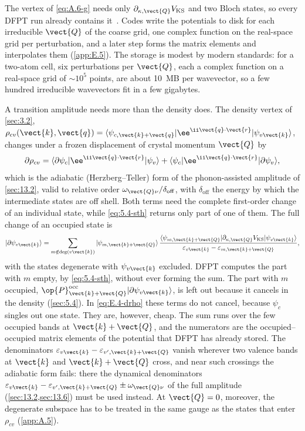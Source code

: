 The vertex of \cref{eq:A.6-g} needs only $\partial_{\kappa,\vect{Q}}V_{\mathrm{KS}}$ and two Bloch states, so every DFPT run already contains it~\cite[Sect.~III.B.3]{giustino2017electron}. Codes write the potentials to disk for each irreducible $\vect{Q}$ of the coarse grid, one complex function on the real-space grid per perturbation, and a later step forms the matrix elements and interpolates them (\cref{app:E.5}). The storage is modest by modern standards: for a two-atom cell, six perturbations per $\vect{Q}$, each a complex function on a real-space grid of $\sim 10^5$ points, are about \SI{10}{MB} per wavevector, so a few hundred irreducible wavevectors fit in a few gigabytes.

A transition amplitude needs more than the density does. The density vertex of \cref{sec:3.2}, $\rho_{cv}(\vect{k},\vect{q}) = \langle\psi_{c,\vect{k}+\vect{q}}|\ee^{\ii\vect{q}\cdot\vect{r}}|\psi_{v\vect{k}}\rangle$, changes under a frozen displacement of crystal momentum $\vect{Q}$ by
\begin{equation}
  \partial\rho_{cv} = \langle\partial\psi_{c}|\ee^{\ii\vect{q}\cdot\vect{r}}|\psi_{v}\rangle + \langle\psi_{c}|\ee^{\ii\vect{q}\cdot\vect{r}}|\partial\psi_{v}\rangle ,
  \label{eq:E.4-drho}
\end{equation}
which is the adiabatic (Herzberg--Teller) form of the phonon-assisted amplitude of \cref{sec:13.2}, valid to relative order $\omega_{\vect{Q}\nu}/\delta_{\mathrm{off}}$, with $\delta_{\mathrm{off}}$ the energy by which the intermediate states are off shell. Both terms need the complete first-order change of an individual state, while \cref{eq:5.4-sth} returns only part of one of them. The full change of an occupied state is
\begin{equation}
  |\partial\psi_{v\vect{k}}\rangle = \sum_{m\notin\mathrm{deg}(v\vect{k})}|\psi_{m,\vect{k}+\vect{Q}}\rangle\,
  \frac{\langle\psi_{m,\vect{k}+\vect{Q}}|\partial_{\kappa,\vect{Q}}V_{\mathrm{KS}}|\psi_{v\vect{k}}\rangle}{\varepsilon_{v\vect{k}} - \varepsilon_{m,\vect{k}+\vect{Q}}} ,
  \label{eq:E.4-dpsi}
\end{equation}
with the states degenerate with $\psi_{v\vect{k}}$ excluded. DFPT computes the part with $m$ empty, by \cref{eq:5.4-sth}, without ever forming the sum. The part with $m$ occupied, $\op{P}^{\mathrm{occ}}_{\vect{k}+\vect{Q}}|\partial\psi_{v\vect{k}}\rangle$, is left out because it cancels in the density (\cref{sec:5.4}). In \cref{eq:E.4-drho} these terms do not cancel, because $\psi_c$ singles out one state. They are, however, cheap. The sum runs over the few occupied bands at $\vect{k}+\vect{Q}$, and the numerators are the occupied--occupied matrix elements of the potential that DFPT has already stored. The denominators $\varepsilon_{v\vect{k}} - \varepsilon_{v',\vect{k}+\vect{Q}}$ vanish wherever two valence bands at $\vect{k}$ and $\vect{k}+\vect{Q}$ cross, and near such crossings the adiabatic form fails: there the dynamical denominators $\varepsilon_{v\vect{k}} - \varepsilon_{v',\vect{k}+\vect{Q}} \pm \omega_{\vect{Q}\nu}$ of the full amplitude (\cref{sec:13.2,sec:13.6}) must be used instead. At $\vect{Q} = 0$, moreover, the degenerate subspace has to be treated in the same gauge as the states that enter $\rho_{cv}$ (\cref{app:A.5}).

